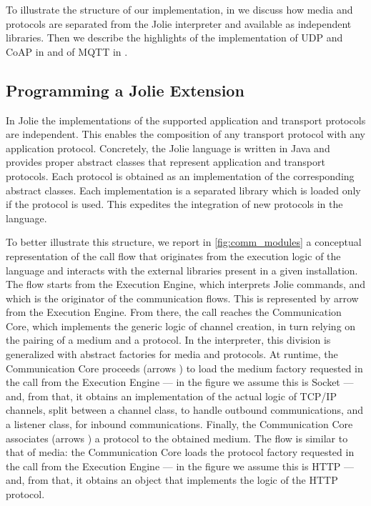 To illustrate the structure of our implementation, in
 we discuss how media and protocols are separated
from the Jolie interpreter and available as independent libraries. Then we
describe the highlights of the implementation of UDP and CoAP in
 and of MQTT in .

\subsection{Programming a Jolie Extension}
\label{sub:jolie_extensions}

In Jolie the implementations of the supported application and transport
protocols are independent. This enables the composition of any transport
protocol with any application protocol. Concretely, the Jolie language is
written in Java and provides proper abstract classes that represent
application and transport protocols. Each protocol is obtained as an
implementation of the corresponding abstract classes. Each implementation is a
separated library which is loaded only if the protocol is used. This expedites
the integration of new protocols in the language.

To better illustrate this structure, we report in \cref{fig:comm_modules} a
conceptual representation of the call flow that originates from the execution
logic of the language and interacts with the external libraries present in a
given installation. The flow starts from the \textsf{Execution Engine}, which
interprets Jolie commands, and which is the originator of the communication
flows. This is represented by arrow  from the \textsf{Execution
Engine}. From there, the call reaches the \textsf{Communication Core}, which
implements the generic logic of channel creation, in turn relying on the
pairing of a medium and a protocol. In the interpreter, this division is
generalized with abstract factories for media and protocols. At runtime, the
\textsf{Communication Core} proceeds (arrows ) to load the medium
factory requested in the call from the \textsf{Execution Engine} --- in the
figure we assume this is \textsf{Socket} --- and, from that, it obtains an
implementation of the actual logic of TCP/IP channels, split between a channel
class, to handle outbound communications, and a listener class, for inbound
communications. Finally, the \textsf{Communication Core} associates (arrows
) a protocol to the obtained medium. The flow is similar to that of
media: the \textsf{Communication Core} loads the protocol factory requested in
the call from the \textsf{Execution Engine} --- in the figure we assume this
is HTTP
--- and, from that, it obtains an object that implements the logic of the HTTP
protocol.

